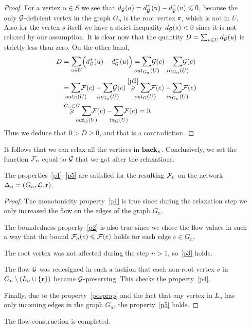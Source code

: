 \documentclass[12pt,oneside,a4paper]{amsart}
\begin{document}
\begin{proof}
          For a vertex $u \in S$ we see that $d_{\cal{G}}(u) = d^{+}_{\cal{G}}(u) - d^{-}_{\cal{G}}(u) \leq 0$,
            because the only $\cal{G}$-deficient vertex in the graph $G_n$ is the root vertex $\root$, which is not in $U$.
          Also for the vertex $s$ itself we have a strict inequality $d_{\cal{G}}(s) < 0$ since it is not relaxed by our assumption.
          It is clear now that the quantity $D = \sum_{u \in U} d_{\cal{G}}(u)$ is strictly less than zero.
          On the other hand,
          \[
            \begin{split}
              D &= \mathlarger\sum_{u \in U} \Big(d^{+}_{\cal{G}}(u) - d^{-}_{\cal{G}}(u)\Big)
              = \mathlarger{\smashoperator{\sum_{\eout_{G_n}(U)}}} \cal{G}(e) - \mathlarger{\smashoperator{\sum_{\ein_{G_n}(U)}}} \cal{G}(e)  \\
              &= \mathlarger{\smashoperator{\sum_{\eout_{G}(U)}}} \flowpos(e) - \mathlarger{\smashoperator{\sum_{\ein_{G_n}(U)}}} \cal{G}(e)
                \overset{\ref{p2}}{\geq} \mathlarger{\smashoperator{\sum_{\eout_G(U)}}} \flowpos(e) - \mathlarger{\smashoperator{\sum_{\ein_{G_n}(U)}}} \flowpos(e) \\
                &\overset{G_n \subset G} \geq \mathlarger{\smashoperator{\sum_{\eout_G(U)}}} \flowpos(e) - \mathlarger{\smashoperator{\sum_{\ein_{G}(U)}}} \flowpos(e) = 0.
            \end{split}
          \]
          Thus we deduce that $0 > D \geq 0$, and that is a contradiction.
        \end{proof}
        It follows that we can relax all the vertices in $\eback_n$.
        Conclusively, we set the function $\flowposn{n}$ equal to $\cal{G}$ that we got after the relaxations.
        \begin{prop}
          The properties~\ref{p1}--\ref{p5} are satisfied for the resulting $\flowposn{n}$ on the network $\net_n = (G_n, \len, \root)$.
        \end{prop}
        \begin{proof}
          The monotonicity property~\ref{p1} is true since during the relaxation step we
            only increased the flow on the edges of the graph $G_n$.

          The boundedness property~\ref{p2} is also true since we chose the flow values in such a way
            that the bound $\flowposn{n}(e) \leq \flowpos(e)$ holds for each edge $e\in G_n$.

          The root vertex was not affected during the step $n > 1$, so~\ref{p3} holds.

          The flow $\cal{G}$ was redesigned in such a fashion that each non-root vertex $v$ in $G_{n} \setminus 
            \left(L_n \cup \{\root\}\right)$ became $\cal{G}$-preserving.
          This checks the property~\ref{p4}.

          Finally, due to the property~\ref{posprop} and the fact that
          any vertex in $L_n$ has only incoming edges in the graph $G_n$, the property~\ref{p5} holds.
        \end{proof}
        The flow construction is completed.
\end{document}

